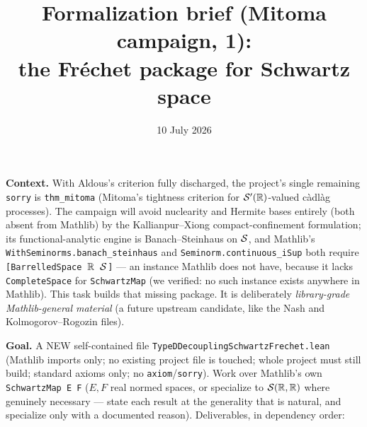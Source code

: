 \documentclass[11pt]{article}
\title{Formalization brief (Mitoma campaign, 1):\\
the Fr\'echet package for Schwartz space}
\date{10 July 2026}
\theoremstyle{plain}
\theoremstyle{remark}
\begin{document}
\maketitle

\noindent\textbf{Context.} With Aldous's criterion fully discharged, the
project's single remaining \texttt{sorry} is \texttt{thm\_mitoma}
(Mitoma's tightness criterion for $\mathcal S'(\mathbb{R})$-valued c\`adl\`ag
processes). The campaign will avoid nuclearity and Hermite bases entirely
(both absent from Mathlib) by the Kallianpur--Xiong compact-confinement
formulation; its functional-analytic engine is Banach--Steinhaus on
$\mathcal{S}$, and Mathlib's \texttt{WithSeminorms.banach\_steinhaus} and
\texttt{Seminorm.continuous\_iSup} both require
\texttt{[BarrelledSpace $\mathbb{R}$ $\mathcal{S}$]} --- an instance Mathlib does not
have, because it lacks \texttt{CompleteSpace} for \texttt{SchwartzMap}
(we verified: no such instance exists anywhere in Mathlib). This task
builds that missing package. It is deliberately \emph{library-grade
Mathlib-general material} (a future upstream candidate, like the Nash and
Kolmogorov--Rogozin files).

\medskip
\noindent\textbf{Goal.} A NEW self-contained file
\texttt{TypeDDecouplingSchwartzFrechet.lean} (Mathlib imports only; no
existing project file is touched; whole project must still build;
standard axioms only; no \texttt{axiom}/\texttt{sorry}). Work over
Mathlib's own \texttt{SchwartzMap E F} ($E,F$ real normed spaces, or
specialize to $\mathcal{S}(\mathbb{R},\mathbb{R})$ where genuinely necessary --- state each
result at the generality that is natural, and specialize only with a
documented reason). Deliverables, in dependency order:
\end{document}
